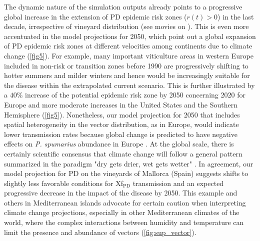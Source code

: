     The dynamic nature of the simulation outputs already points to a
    progressive
    global increase in the extension of PD epidemic risk zones ($r(t)>0$)
    in
    the last decade, irrespective of vineyard distribution (see movies on
    \cite{Webpage}). This is even more accentuated in the model projections for
    2050, which point out a global expansion of PD epidemic risk zones at
    different
    velocities among continents due to climate change (\cref{fig5}). For
    example,
    many important viticulture areas in western Europe included in non-risk or
    transition zones before 1990 are progressively shifting to hotter summers
    and
    milder winters and hence would be increasingly suitable for the disease
    within
    the extrapolated current scenario. This is further illustrated by a $40\%$
    increase of the potential epidemic risk zone by 2050 concerning 2020 for
    Europe
    and more moderate increases in the United States and the Southern
    Hemisphere
    (\cref{fig5}). Nonetheless, our model projection for 2050 that includes
    spatial
    heterogeneity in the vector distribution, as in Europe, would indicate
    lower transmission rates because global change is predicted to have
    negative
    effects on
    \textit{P. spumarius} abundance in Europe \cite{Godefroid2021,Karban2018}.
    At
    the global scale, there is certainly scientific consensus that climate
    change
    will follow a general pattern summarized in the paradigm "dry gets drier,
    wet
    gets wetter" \cite{Feng2015}. In agreement, our model projection for PD on
    the
    vineyards of Mallorca (Spain) suggests shifts to slightly less favorable
    conditions for Xf$_{\textrm{PD}}$ transmission and an expected progressive
    decrease in the impact of the disease by 2050. This example and others in
    Mediterranean islands advocate for certain
    caution
    when interpreting climate change projections, especially in other
    Mediterranean
    climates of the world, where the complex interactions between humidity and
    temperature can limit the presence and abundance of vectors
    (\cref{fig:sup_vector}).

